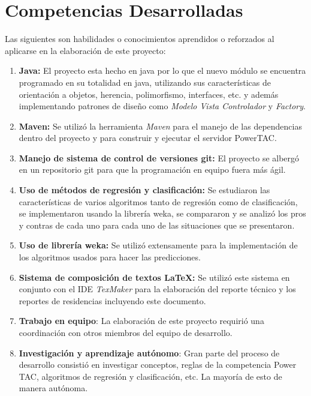 \section{Competencias Desarrolladas}

Las siguientes son habilidades o conocimientos aprendidos o reforzados al aplicarse en la elaboración de este proyecto:
\begin{enumerate}
	\item \textbf{Java:} El proyecto esta hecho en java por lo que el nuevo módulo se encuentra programado en su totalidad en java, utilizando sus características de orientación a objetos,  herencia, polimorfismo, interfaces, etc. y además implementando patrones de diseño como \textit{Modelo Vista Controlador} y \textit{Factory}.
	
	\item \textbf{Maven:} Se utilizó la herramienta \textit{Maven} para el manejo de las dependencias dentro del proyecto y para construir y ejecutar el servidor PowerTAC.

	\item \textbf{Manejo de sistema de control de versiones git:} El proyecto se albergó en un repositorio git para que la programación en equipo fuera más ágil.
	
	\item \textbf{Uso de métodos de regresión y clasificación:} Se estudiaron las características de varios algoritmos tanto de regresión como de clasificación, se implementaron usando la librería weka, se compararon y se analizó los pros y contras de cada uno para cada uno de las situaciones que se presentaron.

	\item \textbf{Uso de librería weka:} Se utilizó extensamente para la implementación de los algoritmos usados para hacer las predicciones.

	\item \textbf{Sistema de composición de textos \LaTeX{}:} Se utilizó este sistema en conjunto con el IDE \textit{TexMaker} para la elaboración del reporte técnico y los reportes de residencias incluyendo este documento.
	
	\item \textbf{Trabajo en equipo}: La elaboración de este proyecto requirió una coordinación con otros miembros del equipo de desarrollo.
	
	\item \textbf{Investigación y aprendizaje autónomo}: Gran parte del proceso de desarrollo consistió en investigar conceptos, reglas de la competencia Power TAC, algoritmos de regresión y clasificación, etc. La mayoría de esto de manera autónoma.
	

\end{enumerate}
